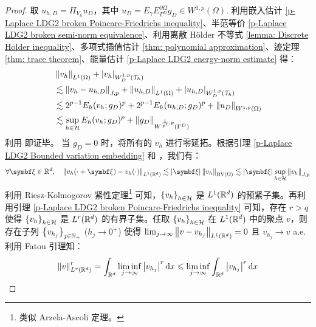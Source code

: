 \begin{theorem}
	\begin{proof}
		取 \(u_{h, D} = \Pi_{V_{h}} u_{D}\)，其中 \(u_{D} = E_{\gamma} E_{\Gamma^{D}}^{\partial\Omega} g_{D} \in W^{1,p}(\Omega)\). 利用嵌入估计 \ref{p-Laplace LDG2 broken Poincare-Friedrichs inequality}、半范等价 \ref{p-Laplace LDG2 broken semi-norm equivalence}、利用离散 H\"{o}lder 不等式 \ref{lemma: Discrete Holder inequality}、多项式插值估计 \ref{thm: polynomial approximation}、迹定理 \ref{thm: trace theorem}、能量估计 \ref{p-Laplace LDG2 energy-norm estimate} 得：
		\begin{align*}
			& \left\lVert v_{h}\right\rVert_{L^{1}(\Omega)} + \left\lvert v_{h}\right\rvert_{W^{1, p}_{D}(\mathcal{T}_{h})} \\
			& \lesssim \left\lVert v_{h} - u_{h, D}\right\rVert_{J, p} + \left\lVert u_{h, D}\right\rVert_{L^{1}(\Omega)} + \left\lvert u_{h, D}\right\rvert_{W^{1, p}_{D}(\mathcal{T}_{h})} \\
			& \lesssim 2^{p-1} E_{h}(v_{h}; g_{D})^{p} + 2^{p-1} E_{h}(u_{h, D}; g_{D})^{p} + \left\lVert u_{D}\right\rVert_{W^{1,p}(\Omega)} \\
			& \lesssim \sup_{h\in\mathcal{H}} E_{h}(v_{h}; g_{D})^{p} + \left\lVert g_{D}\right\rVert_{W^{\frac{1}{p'}, p}(\Gamma^{D})}
		\end{align*}
		利用 \cite[Lemma 8]{10.1093/imanum/drn038} 即证毕。
		\iffalse
		当 \(g_{D} = 0\) 时，将所有的 \(v_{h}\) 进行零延拓。根据引理 \ref{p-Laplace LDG2 Bounded variation embedding} 和 \cite[Lemma 5.5]{10.1093/imanum/drn084}，我们有：
		\begin{equation*}
			\forall \bm\xi \in \R^{d}, \quad 
			\norm{v_{h}(\cdot + \bm\xi) - v_{h}(\cdot)}_{L^{1}(\R^{d})} 
			\lesssim \abs{\bm\xi} \norm{v_{h}}_{{\rm BV}(\Omega)} 
			\lesssim \abs{\bm\xi} \sup_{h \in \mathcal{H}} \norm{v_{h}}_{J, p}
		\end{equation*}
		利用 Riesz-Kolmogorov 紧性定理\footnote{类似 Arzela-Ascoli 定理。} \cite[Theorem A]{10.1007/s11785-023-01346-8} 可知，\(\left\{v_{h}\right\}_{h \in \mathcal{H}}\) 是 \(L^{1}(\mathbb{R}^{d})\) 的预紧子集。再利用引理 \ref{p-Laplace LDG2 broken Poincare-Friedrichs inequality} 可知，存在 \(r > q\) 使得 \(\left\{v_{h}\right\}_{h \in \mathcal{H}}\) 是 \(L^{r}(\mathbb{R}^{d})\) 的有界子集。任取 \(\left\{v_{h}\right\}_{h \in \mathcal{H}}\) 在 \(L^{1}(\mathbb{R}^d)\) 中的聚点 \(v\)，则存在子列 \(\left\{v_{h_{j}}\right\}_{j \in \mathbb{N}_+}\) (\(h_{j} \to 0^{+}\)) 使得 \(\lim_{j \to \infty} \left\lVert v - v_{h_{j}}\right\rVert_{L^{1}(\mathbb{R}^{d})} = 0\) 且 \(v_{h_{j}} \to v\) a.e. 利用 Fatou 引理知：
		\begin{equation*}
			\norm{v}_{L^{r}(\R^d)}^{r} 
			= \int_{\R^{d}} \liminf_{j \to \infty} \abs{v_{h_{j}}}^{r} \d x 
			\leqslant \liminf_{j \to \infty} \int_{\R^{d}} \abs{v_{h_{j}}}^{r} \d x 

\end{equation*}
\end{proof}
\end{theorem}
